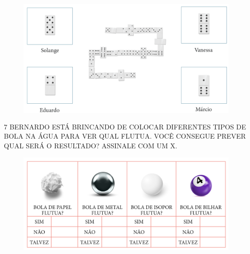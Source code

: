 
\begin{figure}[htpb!]
\includegraphics[width=\textwidth]{../ilustracoes/MAT1/SAEB_1ANO_MAT_FIGURA89.png}
\end{figure}


\num{7} BERNARDO ESTÁ BRINCANDO DE COLOCAR DIFERENTES TIPOS DE BOLA NA ÁGUA
PARA VER QUAL FLUTUA. VOCÊ CONSEGUE PREVER QUAL SERÁ O RESULTADO? ASSINALE
COM UM X.


\begin{figure}[htpb!]
\includegraphics[width=\textwidth]{../ilustracoes/MAT1/SAEB_1ANO_MAT_FIGURA90.png}
\end{figure}

